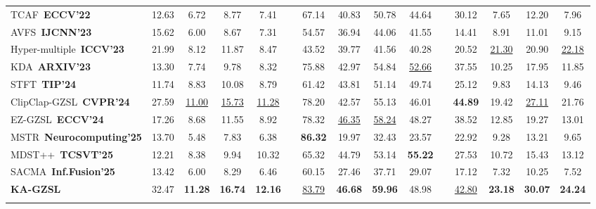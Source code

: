 \documentclass[10pt,journal,twoside]{IEEEtran}
\begin{document}
\begin{table}[!t]
\begin{tabular}{l cccc c cccc c cccc}
    TCAF \cite{5} \,{\scriptsize \textbf{ECCV'22}} & 12.63 & 6.72 & 8.77 & 7.41 & & 67.14 & 40.83 & 50.78 & 44.64 & & 30.12 & 7.65 & 12.20 & 7.96 \\
    AVFS \cite{6} \,{\scriptsize \textbf{IJCNN'23}} & 15.62 & 6.00 & 8.67 & 7.31 & & 54.57 & 36.94 & 44.06 & 41.55 & & 14.41 & 8.91 & 11.01 & 9.15 \\
    Hyper-multiple \cite{7} \,{\scriptsize \textbf{ICCV'23}} & 21.99 & 8.12 & 11.87 & 8.47 & & 43.52 & 39.77 & 41.56 & 40.28 & & 20.52 & \underline{21.30} & 20.90 & \underline{22.18} \\
    KDA \cite{9} \,{\scriptsize \textbf{ARXIV'23}} & 13.30 & 7.74 & 9.78 & 8.32 & & 75.88 & 42.97 & 54.84 & \underline{52.66} & & 37.55 & 10.25 & 17.95 & 11.85 \\
    STFT\cite{43} \,{\scriptsize \textbf{TIP'24}} & 11.74 & 8.83 & 10.08 & 8.79 & & 61.42 & 43.81 & 51.14 & 49.74 & & 25.12 & 9.83 & 14.13 & 9.46 \\
    ClipClap-GZSL \cite{2} \,{\scriptsize \textbf{CVPR'24}} & 27.59 & \underline{11.00} & \underline{15.73} & \underline{11.28} & & 78.20 & 42.57 & 55.13 & 46.01 & & \textbf{44.89} & 19.42 & \underline{27.11} & 21.76 \\
    EZ-GZSL \cite{12} \,{\scriptsize \textbf{ECCV'24}} & 17.26 & 8.68 & 11.55 & 8.92 & & 78.32 & \underline{46.35} & \underline{58.24} & 48.27 & & 38.52 & 12.85 & 19.27 & 13.01 \\
    MSTR \cite{14} \,{\scriptsize \textbf{Neurocomputing'25}} & 13.70 & 5.48 & 7.83 & 6.38 & & \textbf{86.32} & 19.97 & 32.43 & 23.57 & & 22.92 & 9.28 & 13.21 & 9.65 \\
    MDST++ \cite{44} \,{\scriptsize \textbf{TCSVT'25}} & 12.21 & 8.38 & 9.94 & 10.32 & & 65.32 & 44.79 & 53.14 & \textbf{55.22} & & 27.53 & 10.72 & 15.43 & 13.12 \\
    SACMA \cite{45} \,{\scriptsize \textbf{Inf.Fusion'25}} & 13.42 & 6.00 & 8.29 & 6.46 & & 60.15 & 27.46 & 37.71 & 29.07 & & 17.12 & 7.32 & 10.25 & 7.52 \\
    
    \noalign{\global\setlength{\oldaboverulesep}{\aboverulesep}}
    \noalign{\global\setlength{\oldbelowrulesep}{\belowrulesep}}
    \noalign{\global\setlength{\aboverulesep}{0pt}}
    \noalign{\global\setlength{\belowrulesep}{1.5pt}}
    \midrule[1pt]
    \rowcolor{gray!25}
    \textbf{KA-GZSL} & 32.47 & \textbf{11.28} & \textbf{16.74} & \textbf{12.16} & & \underline{83.79} & \textbf{46.68} & \textbf{59.96} & 48.98 & & \underline{42.80} & \textbf{23.18} & \textbf{30.07} & \textbf{24.24}\\
    \bottomrule[2pt]
    \noalign{\global\setlength{\aboverulesep}{\oldaboverulesep}}
    \noalign{\global\setlength{\belowrulesep}{\oldbelowrulesep}}
    
  \end{tabular}
\end{table}
\end{document}

